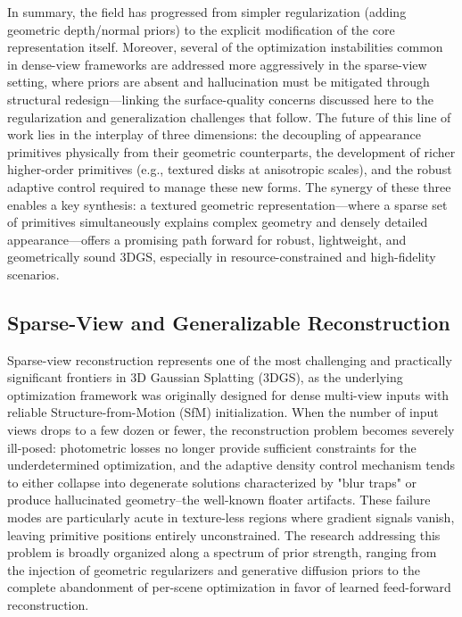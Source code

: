 \documentclass[11pt,a4paper]{article}
\begin{document}
In summary, the field has progressed from simpler regularization (adding geometric depth/normal priors) to the explicit modification of the core representation itself. Moreover, several of the optimization instabilities common in dense-view frameworks are addressed more aggressively in the sparse-view setting, where priors are absent and hallucination must be mitigated through structural redesign---linking the surface-quality concerns discussed here to the regularization and generalization challenges that follow. The future of this line of work lies in the interplay of three dimensions: the decoupling of appearance primitives physically from their geometric counterparts, the development of richer higher-order primitives (e.g., textured disks at anisotropic scales), and the robust adaptive control required to manage these new forms. The synergy of these three enables a key synthesis: a textured geometric representation---where a sparse set of primitives simultaneously explains complex geometry and densely detailed appearance---offers a promising path forward for robust, lightweight, and geometrically sound 3DGS, especially in resource-constrained and high-fidelity scenarios.


\subsection{Sparse-View and Generalizable Reconstruction}


Sparse-view reconstruction represents one of the most challenging and practically significant frontiers in 3D Gaussian Splatting (3DGS), as the underlying optimization framework was originally designed for dense multi-view inputs with reliable Structure-from-Motion (SfM) initialization. When the number of input views drops to a few dozen or fewer, the reconstruction problem becomes severely ill-posed: photometric losses no longer provide sufficient constraints for the underdetermined optimization, and the adaptive density control mechanism tends to either collapse into degenerate solutions characterized by "blur traps" or produce hallucinated geometry--the well-known floater artifacts. These failure modes are particularly acute in texture-less regions where gradient signals vanish, leaving primitive positions entirely unconstrained. The research addressing this problem is broadly organized along a spectrum of prior strength, ranging from the injection of geometric regularizers and generative diffusion priors to the complete abandonment of per-scene optimization in favor of learned feed-forward reconstruction.
\end{document}

